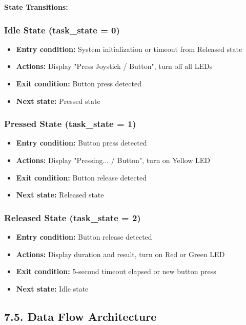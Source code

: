\documentclass[12pt]{article}
\begin{document}
\textbf{State Transitions:}

\subsubsection*{Idle State (task\_state = 0)}

\begin{itemize}
    \item \textbf{Entry condition:} System initialization or timeout from Released state
    \item \textbf{Actions:} Display "Press Joystick / Button", turn off all LEDs
    \item \textbf{Exit condition:} Button press detected
    \item \textbf{Next state:} Pressed state
\end{itemize}

\subsubsection*{Pressed State (task\_state = 1)}

\begin{itemize}
    \item \textbf{Entry condition:} Button press detected
    \item \textbf{Actions:} Display "Pressing... / Button", turn on Yellow LED
    \item \textbf{Exit condition:} Button release detected
    \item \textbf{Next state:} Released state
\end{itemize}

\subsubsection*{Released State (task\_state = 2)}

\begin{itemize}
    \item \textbf{Entry condition:} Button release detected
    \item \textbf{Actions:} Display duration and result, turn on Red or Green LED
    \item \textbf{Exit condition:} 5-second timeout elapsed or new button press
    \item \textbf{Next state:} Idle state
\end{itemize}

\subsection*{7.5. Data Flow Architecture}
\end{document}
